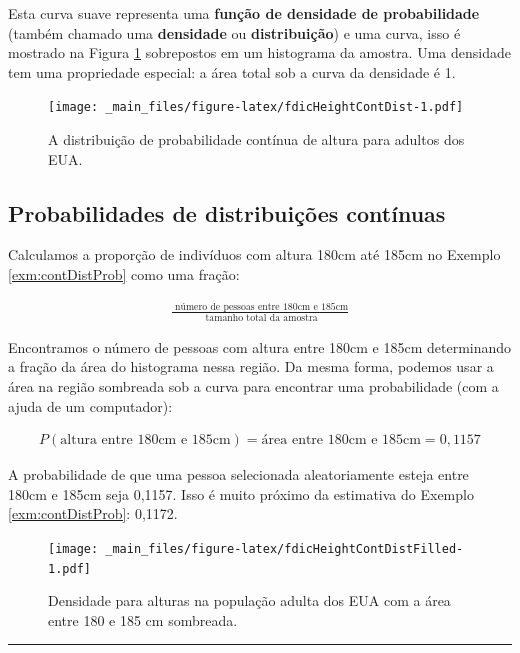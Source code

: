 \documentclass[
]{book}
\theoremstyle{definition}
\theoremstyle{definition}
\theoremstyle{definition}
\theoremstyle{definition}
\theoremstyle{remark}
\begin{document}
Esta curva suave representa uma \textbf{função de densidade de probabilidade} (também chamado uma \textbf{densidade} ou \textbf{distribuição}) e uma curva, isso é mostrado na Figura \ref{fig:fdicHeightContDist} sobrepostos em um histograma da amostra. Uma densidade tem uma propriedade especial: a área total sob a curva da densidade é 1.

\begin{figure}
\centering
\texttt{[image: \_main\_files/figure-latex/fdicHeightContDist-1.pdf]}
\caption{\label{fig:fdicHeightContDist}A distribuição de probabilidade contínua de altura para adultos dos EUA.}
\end{figure}

\hypertarget{probContinuousDistribution}{%
\subsection{Probabilidades de distribuições contínuas}\label{probContinuousDistribution}}

Calculamos a proporção de indivíduos com altura 180cm até 185cm no Exemplo \ref{exm:contDistProb} como uma fração:

\begin{eqnarray*}
\frac{\text{ número de pessoas entre 180cm e 185cm}}{\text{ tamanho total da amostra}}
\end{eqnarray*}

Encontramos o número de pessoas com altura entre 180cm e 185cm determinando a fração da área do histograma nessa região. Da mesma forma, podemos usar a área na região sombreada sob a curva para encontrar uma probabilidade (com a ajuda de um computador):

\begin{eqnarray*}
P(\text{altura entre 180cm e 185cm})
    = \text{área entre 180cm e 185cm}
    = 0,1157
\end{eqnarray*}

A probabilidade de que uma pessoa selecionada aleatoriamente esteja entre 180cm e 185cm seja 0,1157. Isso é muito próximo da estimativa do Exemplo \ref{exm:contDistProb}: 0,1172.

\begin{figure}
\centering
\texttt{[image: \_main\_files/figure-latex/fdicHeightContDistFilled-1.pdf]}
\caption{\label{fig:fdicHeightContDistFilled}Densidade para alturas na população adulta dos EUA com a área entre 180 e 185 cm sombreada.}
\end{figure}

\begin{center}\rule{0.5\linewidth}{0.5pt}\end{center}
\end{document}
